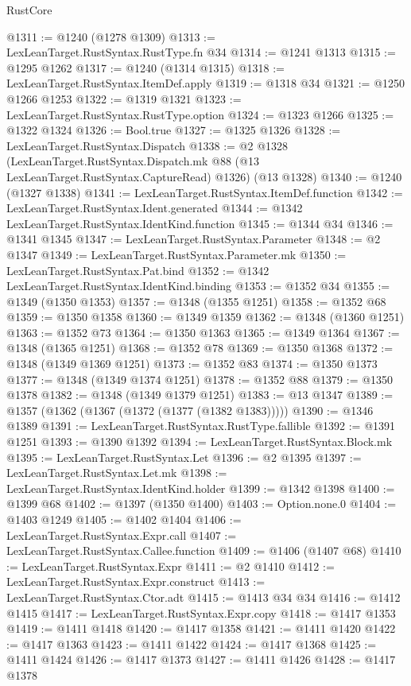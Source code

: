 \begin{lexlean}{RustCore}
\begin{coremodule}
@1311 := @1240 (@1278 @1309)
@1313 := LexLeanTarget.RustSyntax.RustType.fn @34
@1314 := @1241 @1313
@1315 := @1295 @1262
@1317 := @1240 (@1314 @1315)
@1318 := LexLeanTarget.RustSyntax.ItemDef.apply
@1319 := @1318 @34
@1321 := @1250 @1266 @1253
@1322 := @1319 @1321
@1323 := LexLeanTarget.RustSyntax.RustType.option
@1324 := @1323 @1266
@1325 := @1322 @1324
@1326 := Bool.true
@1327 := @1325 @1326
@1328 := LexLeanTarget.RustSyntax.Dispatch
@1338 := @2
    @1328
    (LexLeanTarget.RustSyntax.Dispatch.mk @88 (@13 LexLeanTarget.RustSyntax.CaptureRead) @1326)
    (@13 @1328)
@1340 := @1240 (@1327 @1338)
@1341 := LexLeanTarget.RustSyntax.ItemDef.function
@1342 := LexLeanTarget.RustSyntax.Ident.generated
@1344 := @1342 LexLeanTarget.RustSyntax.IdentKind.function
@1345 := @1344 @34
@1346 := @1341 @1345
@1347 := LexLeanTarget.RustSyntax.Parameter
@1348 := @2 @1347
@1349 := LexLeanTarget.RustSyntax.Parameter.mk
@1350 := LexLeanTarget.RustSyntax.Pat.bind
@1352 := @1342 LexLeanTarget.RustSyntax.IdentKind.binding
@1353 := @1352 @34
@1355 := @1349 (@1350 @1353)
@1357 := @1348 (@1355 @1251)
@1358 := @1352 @68
@1359 := @1350 @1358
@1360 := @1349 @1359
@1362 := @1348 (@1360 @1251)
@1363 := @1352 @73
@1364 := @1350 @1363
@1365 := @1349 @1364
@1367 := @1348 (@1365 @1251)
@1368 := @1352 @78
@1369 := @1350 @1368
@1372 := @1348 (@1349 @1369 @1251)
@1373 := @1352 @83
@1374 := @1350 @1373
@1377 := @1348 (@1349 @1374 @1251)
@1378 := @1352 @88
@1379 := @1350 @1378
@1382 := @1348 (@1349 @1379 @1251)
@1383 := @13 @1347
@1389 := @1357 (@1362 (@1367 (@1372 (@1377 (@1382 @1383)))))
@1390 := @1346 @1389
@1391 := LexLeanTarget.RustSyntax.RustType.fallible
@1392 := @1391 @1251
@1393 := @1390 @1392
@1394 := LexLeanTarget.RustSyntax.Block.mk
@1395 := LexLeanTarget.RustSyntax.Let
@1396 := @2 @1395
@1397 := LexLeanTarget.RustSyntax.Let.mk
@1398 := LexLeanTarget.RustSyntax.IdentKind.holder
@1399 := @1342 @1398
@1400 := @1399 @68
@1402 := @1397 (@1350 @1400)
@1403 := Option.none.{0}
@1404 := @1403 @1249
@1405 := @1402 @1404
@1406 := LexLeanTarget.RustSyntax.Expr.call
@1407 := LexLeanTarget.RustSyntax.Callee.function
@1409 := @1406 (@1407 @68)
@1410 := LexLeanTarget.RustSyntax.Expr
@1411 := @2 @1410
@1412 := LexLeanTarget.RustSyntax.Expr.construct
@1413 := LexLeanTarget.RustSyntax.Ctor.adt
@1415 := @1413 @34 @34
@1416 := @1412 @1415
@1417 := LexLeanTarget.RustSyntax.Expr.copy
@1418 := @1417 @1353
@1419 := @1411 @1418
@1420 := @1417 @1358
@1421 := @1411 @1420
@1422 := @1417 @1363
@1423 := @1411 @1422
@1424 := @1417 @1368
@1425 := @1411 @1424
@1426 := @1417 @1373
@1427 := @1411 @1426
@1428 := @1417 @1378

\end{coremodule}
\end{lexlean}
